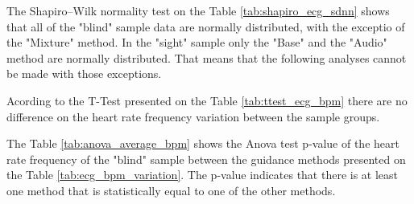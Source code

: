 

%
%    
%
%
%
%
%    
%
The Shapiro–Wilk normality test on the Table \ref{tab:shapiro_ecg_sdnn} shows that all of the "blind" sample data are normally distributed, with the exceptio of the "Mixture" method. In the "sight" sample only the "Base" and the "Audio" method are normally distributed. That means that the following analyses cannot be made with those exceptions.



Acording to the T-Test presented on the Table \ref{tab:ttest_ecg_bpm} there are no difference on the heart rate frequency variation between the sample groups.



The Table \ref{tab:anova_average_bpm} shows the Anova test p-value of the heart rate frequency of the "blind" sample between the guidance methods presented on the Table \ref{tab:ecg_bpm_variation}. The p-value indicates that there is at least one method that is statistically equal to one of the other methods.

